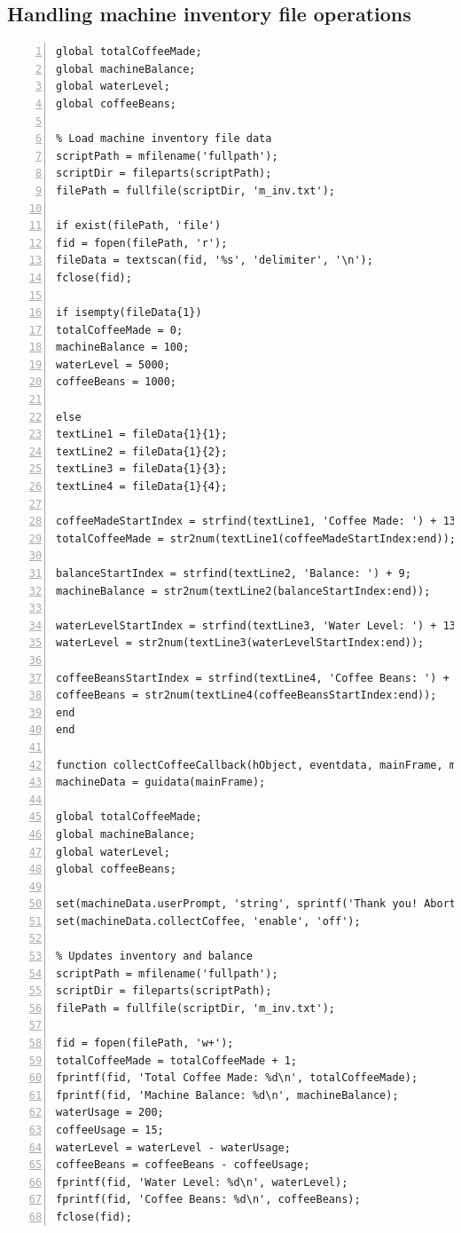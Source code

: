 \documentclass[a4paper, 11pt]{article}
\begin{document}
\subsection{Handling machine inventory file operations}
\begin{lstlisting}[style=Matlab-editor, numbers = left, frame = single]
% Declare global variables for machine stats
global totalCoffeeMade;
global machineBalance;
global waterLevel;
global coffeeBeans;

% Load machine inventory file data
scriptPath = mfilename('fullpath');
scriptDir = fileparts(scriptPath);
filePath = fullfile(scriptDir, 'm_inv.txt');

if exist(filePath, 'file')
fid = fopen(filePath, 'r');
fileData = textscan(fid, '%s', 'delimiter', '\n');
fclose(fid);

if isempty(fileData{1})
totalCoffeeMade = 0;
machineBalance = 100;
waterLevel = 5000;
coffeeBeans = 1000;

else
textLine1 = fileData{1}{1};
textLine2 = fileData{1}{2};
textLine3 = fileData{1}{3};
textLine4 = fileData{1}{4};

coffeeMadeStartIndex = strfind(textLine1, 'Coffee Made: ') + 13;
totalCoffeeMade = str2num(textLine1(coffeeMadeStartIndex:end));

balanceStartIndex = strfind(textLine2, 'Balance: ') + 9;
machineBalance = str2num(textLine2(balanceStartIndex:end));

waterLevelStartIndex = strfind(textLine3, 'Water Level: ') + 13;
waterLevel = str2num(textLine3(waterLevelStartIndex:end));

coffeeBeansStartIndex = strfind(textLine4, 'Coffee Beans: ') + 14;
coffeeBeans = str2num(textLine4(coffeeBeansStartIndex:end));
end
end

function collectCoffeeCallback(hObject, eventdata, mainFrame, miniWindow, actions)
machineData = guidata(mainFrame);

global totalCoffeeMade;
global machineBalance;
global waterLevel;
global coffeeBeans;

set(machineData.userPrompt, 'string', sprintf('Thank you! Aborting in 10 seconds...'));
set(machineData.collectCoffee, 'enable', 'off');

% Updates inventory and balance
scriptPath = mfilename('fullpath');
scriptDir = fileparts(scriptPath);
filePath = fullfile(scriptDir, 'm_inv.txt');

fid = fopen(filePath, 'w+');
totalCoffeeMade = totalCoffeeMade + 1;
fprintf(fid, 'Total Coffee Made: %d\n', totalCoffeeMade);
fprintf(fid, 'Machine Balance: %d\n', machineBalance);
waterUsage = 200;
coffeeUsage = 15;
waterLevel = waterLevel - waterUsage;
coffeeBeans = coffeeBeans - coffeeUsage;
fprintf(fid, 'Water Level: %d\n', waterLevel);
fprintf(fid, 'Coffee Beans: %d\n', coffeeBeans);
fclose(fid);
\end{lstlisting}
\end{document}
